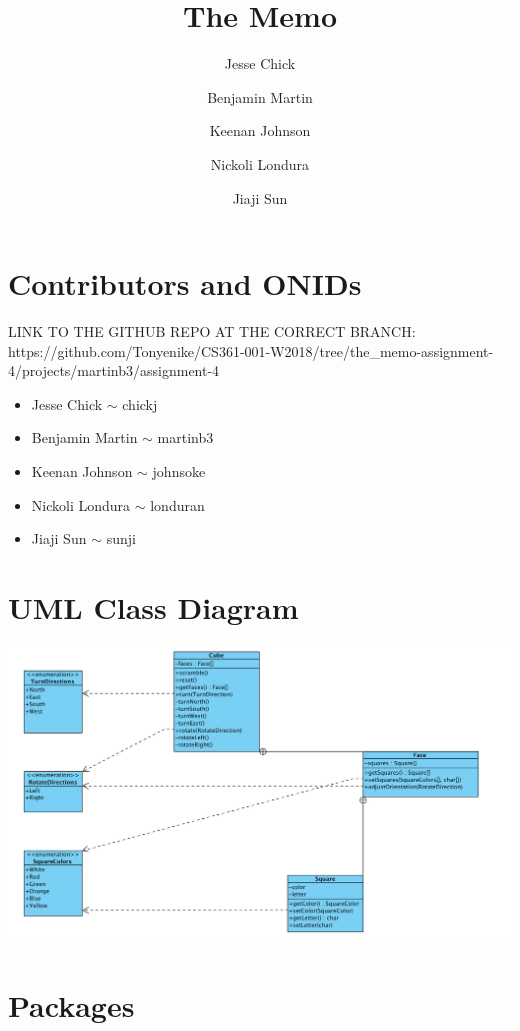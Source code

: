 \documentclass[12pt]{article}
\title{The Memo}
\author{Jesse Chick\\
\and Benjamin Martin\\
\and Keenan Johnson\\
\and Nickoli Londura\\
\and Jiaji Sun}
\begin{document}
\maketitle
\tableofcontents

\section{Contributors and ONIDs}
\par
LINK TO THE GITHUB REPO AT THE CORRECT BRANCH: https://github.com/Tonyenike/CS361-001-W2018/tree/the\_memo-assignment-4/projects/martinb3/assignment-4

\begin{itemize}
	\item Jesse Chick $\sim$ chickj
	\item Benjamin Martin $\sim$ martinb3
	\item Keenan Johnson $\sim$ johnsoke
	\item Nickoli Londura $\sim$ londuran
	\item Jiaji Sun $\sim$ sunji
\end{itemize}

\section{UML Class Diagram}
	
	\includegraphics[width = \textwidth]{diagram.PNG}

\section{Packages}
\end{document}
